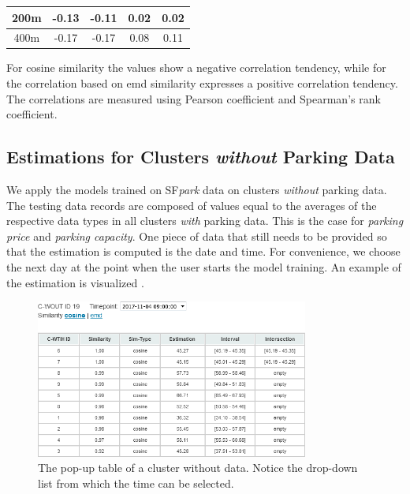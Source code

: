 \begin{table}[!ht]
{\begin{tabular}{ | c | c | c | c | c | }
			200m & -0.13 & -0.11 & 0.02 & 0.02 \\ \hline
			400m & -0.17 & -0.17 & 0.08 & 0.11 \\ \hline
		\end{tabular}}
		\label{tab:similarity_vs_estimation}
		\begin{tabnote}
			For cosine similarity the values show a negative correlation tendency, while for the correlation based on emd similarity expresses a positive correlation tendency. The correlations are measured using Pearson coefficient and Spearman's rank coefficient.
		\end{tabnote}
\end{table}	

\subsection{Estimations for Clusters \textit{without} Parking Data}
\label{evaluation:estimations_cwout}
We apply the models trained on SF\textit{park} data on clusters \textit{without} parking data.
The testing data records are composed of values equal to the averages of the respective data types in all clusters \textit{with} parking data.
This is the case for \textit{parking price} and \textit{parking capacity}.
One piece of data that still needs to be provided so that the estimation is computed is the date and time.
For convenience, we choose the next day at the point when the user starts the model training. 
An example of the estimation is visualized .

\begin{figure}[!ht]
	\centering
	\includegraphics[width=0.8\textwidth]{graphics/cwout_cosine_table.png}
	\caption{The pop-up table of a cluster without data.
		Notice the drop-down list from which the time can be selected.}
	\label{fig:cwout_table}
\end{figure}

